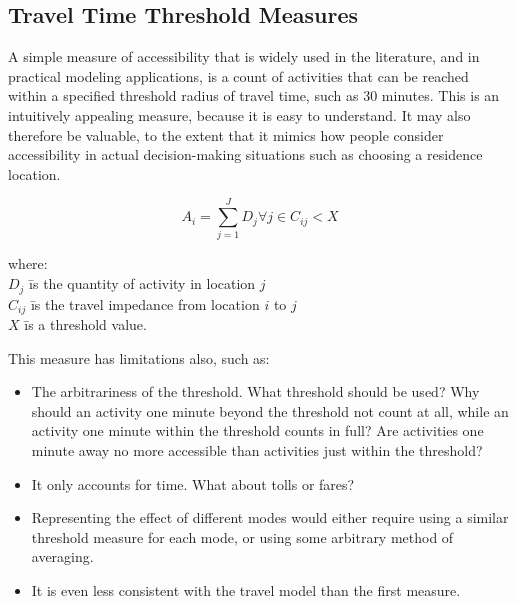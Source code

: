 \subsection{Travel Time Threshold Measures}

A simple measure of accessibility that is widely used in the
literature, and in practical modeling applications, is a count of
activities that can be reached within a specified threshold radius
of travel time, such as 30 minutes. This is an intuitively
appealing measure, because it is easy to understand.  It may also
therefore be valuable, to the extent that it mimics how people
consider accessibility in actual decision-making situations such
as choosing a residence location.

\begin{equation}
A_i = \sum_{j=1}^{J} D_j \forall j \in C_{ij} < X
\end{equation}

\begin{tabbing}

where: \= \\
\> $D_j$ \= is the quantity of activity in location $j$ \\

\> $C_{ij}$ \=is the travel impedance from location $i$ to $j$ \\

\> $X$ \=is a threshold value.

\end{tabbing}


This measure has limitations also, such as:

\begin{itemize}

\item The arbitrariness of the threshold.  What threshold should
be used? Why should an activity one minute beyond the threshold
not count at all, while an activity one minute within the
threshold counts in full?  Are activities one minute away no more
accessible than activities just within the threshold?

\item It only accounts for time.  What about tolls or fares?

\item Representing the effect of different modes would either
require using a similar threshold measure for each mode, or using
some arbitrary method of averaging.

\item It is even less consistent with the travel model than the
first measure.

\end{itemize}

